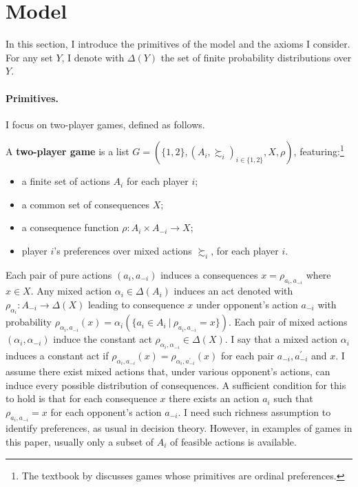 \section{Model}\label{sec:modeluniv}

In this section, I introduce the primitives of the model and the axioms I consider. For any set \( Y \), I denote with \( \Delta ( Y ) \) the set of finite probability distributions over \( Y \).

\paragraph{Primitives.} I focus on two-player games, defined as follows.

\begin{definition}\label{def:game}
	A \textbf{two-player game} is a list \( G = ( \{1,2 \}, ( A_i, \succsim_i )_{i \in \{1,2 \}}, X,  \rho ) \), featuring:\footnote{The textbook by \cite{bonannoGameTheory2018} discusses games whose primitives are ordinal preferences.}
	\begin{itemize}
		\item a finite set of actions \(A_i\) for each player \( i \);
		\item a common set of consequences \( X \);
		\item a consequence function \(\rho \colon A_i \times  A_{-i} \rightarrow X \);
		\item player \(i\)'s preferences over mixed actions \(\succsim_i \), for each player \( i \).
	\end{itemize}
\end{definition}

Each pair of pure actions \( (a_i, a_{-i} ) \) induces a consequences \( x = \rho_{a_i, a_{-i}} \) where \( x \in X \). Any mixed action \( \alpha_i \in \Delta ( A_i ) \) induces an \citeauthor{anscombeDefinitionSubjectiveProbability1963} act denoted with \( \rho_{\alpha_i} \colon A_{-i} \rightarrow \Delta ( X ) \) leading to consequence \( x \) under opponent's action \( a_{-i} \) with probability \( \rho_{\alpha_i,a_{-i}} ( x ) = \alpha_i ( \{ a_i \in A_i \: | \: \rho_{a_i,a_{-i}} = x \} ) \). Each pair of mixed actions \( (\alpha_i, \alpha_{-i}) \) induce the constant act \( \rho_{\alpha_i, \alpha_{-i}} \in \Delta (X) \). I say that a mixed action \( \alpha_i \) induces a constant act if \( \rho_{\alpha_i, a_{-i}} (x) = \rho_{\alpha_i, a^{\prime}_{-i}} (x) \) for each pair \(a_{-i}, a^{\prime}_{-i} \) and \( x \). I assume there exist mixed actions that, under various opponent's actions, can induce every possible distribution of consequences. A sufficient condition for this to hold is that for each consequence \( x \) there exists an action \( a_i \) such that \( \rho_{a_i,a_{-i}} = x \) for each opponent's action \( a_{-i} \). I need such richness assumption to identify preferences, as usual in decision theory. However, in examples of games in this paper, usually only a subset of \( A_i \) of feasible actions is available.

